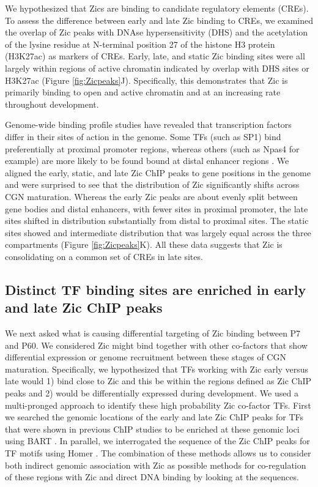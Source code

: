 \documentclass[fleqn,10pt]{wlscirep}
\begin{document}
We hypothesized that Zics are binding to candidate regulatory elements (CREs). To assess the difference between early and late Zic binding to CREs, we examined the overlap of Zic peaks with DNAse hypersensitivity (DHS) and the acetylation of the lysine residue at N-terminal position 27 of the histone H3 protein (H3K27ac) as markers of CREs. Early, late, and static Zic binding sites were all largely within regions of active chromatin indicated by overlap with DHS sites or H3K27ac (Figure \ref{fig:Zicpeaks}J). Specifically, this demonstrates that Zic is primarily binding to open and active chromatin and at an increasing rate throughout development. 

Genome-wide binding profile studies have revealed that transcription factors differ in their sites of action in the genome. Some TFs (such as SP1) bind preferentially at proximal promoter regions, whereas others (such as Npas4 for example) are more likely to be found bound at distal enhancer regions \cite{Kaczynski2003Sp1-Factors, Lyons2011MechanismsTranscription}. We aligned the early, static, and late Zic ChIP peaks to gene positions in the genome and were surprised to see that the distribution of Zic significantly shifts across CGN maturation. Whereas the early Zic peaks are about evenly split between gene bodies and distal enhancers, with fewer sites in proximal promoter, the late sites shifted in distribution substantially from distal to proximal sites. The static sites showed and intermediate distribution that was largely equal across the three compartments (Figure \ref{fig:Zicpeaks}K). All these data suggests that Zic is consolidating on a common set of CREs in late sites. 

\subsection*{Distinct TF binding sites are enriched in early and late Zic ChIP peaks}

We next asked what is causing differential targeting of Zic binding between P7 and P60. We considered Zic might bind together with other co-factors that show differential expression or genome recruitment between these stages of CGN maturation. Specifically, we hypothesized that TFs working with Zic early versus late would 1) bind close to Zic and this be within the regions defined as Zic ChIP peaks and 2) would be differentially expressed during development. We used a  multi-pronged approach to identify these high probability Zic co-factor TFs. First we searched the genomic locations of the early and late Zic ChIP peaks for TFs that were shown in previous ChIP studies to be enriched at these genomic loci using BART \cite{Zhenjiawang2018BART:Profiles, Ma2021BARTweb:Analysis}. In parallel, we interrogated the sequence of the Zic ChIP peaks for TF motifs using Homer \cite{}. The combination of these methods allows us to consider both indirect genomic association with Zic as possible methods for co-regulation of these regions with Zic and direct DNA binding by looking at the sequences. 
\end{document}
